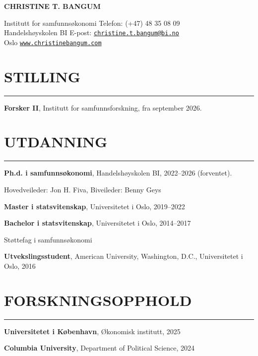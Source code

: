 \documentclass{article}
\newcommand{\cvsection}[1]{\section*{\normalfont#1} \vspace{-0.15cm}\hrule \hspace{1.6em}}
\begin{document}
\begin{center}
    \Huge{
    \rmfamily
    \textbf{CHRISTINE T. BANGUM}}
\end{center}
\vspace{20pt}


\setlength{\parskip}{1pt}
\renewcommand{\arraystretch}{1.25}


\noindent Institutt for samfunns{\o}konomi \hfill Telefon: (+47) 48 35 08 09 \\
\noindent Handelsh{\o}yskolen BI \hfill E-post: \href{mailto:christine.t.bangum@bi.no} {\texttt{christine.t.bangum@bi.no}} \\
 Oslo \hfill \href{www.christinebangum.com}{\texttt{www.christinebangum.com}}

\setlength{\parskip}{3pt}

\cvsection{STILLING}

\noindent
\hspace{0.4em}
\textbf{Forsker II}, Institutt for samfunnsforskning, fra september 2026.


\cvsection{UTDANNING}

\noindent
\hspace{0.4em}
\textbf{Ph.d. i samfunns{\o}konomi}, Handelsh{\o}yskolen BI, 2022--2026 (forventet).

Hovedveileder: Jon H. Fiva, Biveileder: Benny Geys

\noindent
\hspace{0.4em}
\textbf{Master i statsvitenskap}, Universitetet i Oslo, 2019--2022

\noindent
\hspace{0.4em}
\textbf{Bachelor i statsvitenskap}, Universitetet i Oslo, 2014--2017

St{\o}ttefag i samfunns{\o}konomi

\noindent
\hspace{0.4em}
\textbf{Utvekslingsstudent}, American University, Washington, D.C., Universitetet i Oslo, 2016


\cvsection{FORSKNINGSOPPHOLD}

\noindent
\hspace{0.4em}
\textbf{Universitetet i K{\o}benhavn}, {\O}konomisk institutt, 2025

\noindent
\hspace{0.4em}
\textbf{Columbia University}, Department of Political Science, 2024
\end{document}
